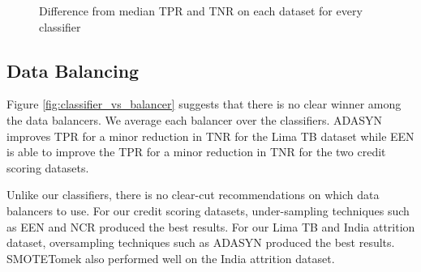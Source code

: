 \documentclass{sig-alternate-05-2015}
\begin{document}
\begin{table}
{\begin{tabular}{l|c|c|c|c|c}
				              		
		\end{tabular}}
		\vspace{-1em}
	\end{table}
	
	\begin{figure}
		\hspace*{1em}
		\centering
		\caption{Difference from median TPR and TNR on each dataset for every classifier}
		\label{fig:classifier_comparision}
	\end{figure}
	
	\subsection{Data Balancing}
	Figure \ref{fig:classifier_vs_balancer} suggests that there is no clear winner among the data balancers. We average each balancer over the classifiers. ADASYN improves TPR for a minor reduction in TNR for the Lima TB dataset while EEN is able to improve the TPR for a minor reduction in TNR for the two credit scoring datasets.
	
	Unlike our classifiers, there is no clear-cut recommendations on which data balancers to use. For our credit scoring datasets, under-sampling techniques such as EEN and NCR produced the best results. For our Lima TB and India attrition dataset, oversampling techniques such as ADASYN produced the best results. SMOTETomek also performed well on the India attrition dataset.
	
\end{document}
